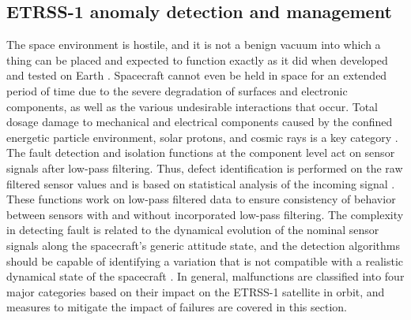 \documentclass[final,5p,times,twocolumn]{elsarticle}
\begin{document}
\subsection{ETRSS-1 anomaly detection and management}
The space environment is hostile, and it is not a benign vacuum into which a thing can be placed and expected to function exactly as it did when developed and tested on Earth \cite{vampola1994analysis}.  Spacecraft cannot even be held in space for an extended period of time due to the severe degradation of surfaces and electronic components, as well as the various undesirable interactions that occur. Total dosage damage to mechanical and electrical components caused by the confined energetic particle environment, solar protons, and cosmic rays is a key category \cite{vampola1994analysis}. The fault detection and isolation functions at the component level act on sensor signals after low-pass filtering. Thus, defect identification is performed on the raw filtered sensor values and is based on statistical analysis of the incoming signal \cite{colagrossi2022fault}. These functions work on low-pass filtered data to ensure consistency of behavior between sensors with and without incorporated low-pass filtering. The complexity in detecting fault is related to the dynamical evolution of the nominal sensor signals along the spacecraft's generic attitude state, and the detection algorithms should be capable of identifying a variation that is not compatible with a realistic dynamical state of the spacecraft \cite{colagrossi2022fault}. In general, malfunctions are classified into four major categories based on their impact on the ETRSS-1 satellite in orbit, and measures to mitigate the impact of failures are covered in this section.
\end{document}
